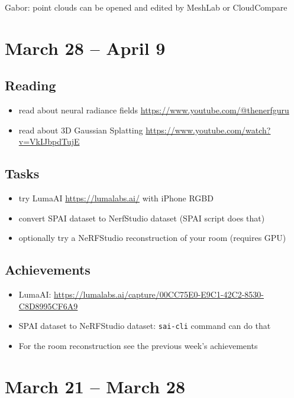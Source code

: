 \documentclass{article}
\begin{document}
Gabor: point clouds can be opened and edited by MeshLab or CloudCompare
\newpage


\section{March 28 -- April 9}
\subsection{Reading}
\begin{itemize}
    \item read about neural radiance fields \url{https://www.youtube.com/@thenerfguru}
    \item read about 3D Gaussian Splatting \url{https://www.youtube.com/watch?v=VkIJbpdTujE}
\end{itemize}

\subsection{Tasks}
\begin{itemize}
\item try LumaAI \url{https://lumalabs.ai/} with iPhone RGBD 
\item convert SPAI dataset to NerfStudio dataset (SPAI script does that) 
\item optionally try a NeRFStudio reconstruction of your room (requires GPU) 
\end{itemize}

\subsection{Achievements}
\begin{itemize}
    \item LumaAI: \url{https://lumalabs.ai/capture/00CC75E0-E9C1-42C2-8530-C8D8995CF6A9}
    \item SPAI dataset to NeRFStudio dataset: \verb|sai-cli| command can do that
    \item For the room reconstruction see the previous week's achievements
\end{itemize}

\newpage



\section{March 21 -- March 28}
\end{document}
